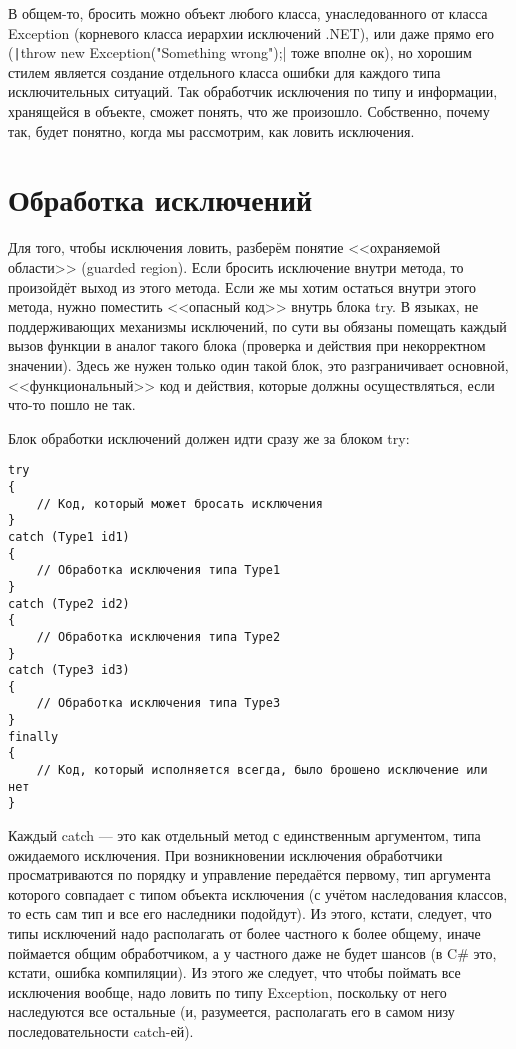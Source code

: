 \documentclass{../../text-style}
\begin{document}
В общем-то, бросить можно объект любого класса, унаследованного от класса Exception (корневого класса иерархии исключений .NET), или даже прямо его (\texttt|throw new Exception("Something wrong");| тоже вполне ок), но хорошим стилем является создание отдельного класса ошибки для каждого типа исключительных ситуаций. Так обработчик исключения по типу и информации, хранящейся в объекте, сможет понять, что же произошло. Собственно, почему так, будет понятно, когда мы рассмотрим, как ловить исключения. 

\section{Обработка исключений}

Для того, чтобы исключения ловить, разберём понятие <<охраняемой области>> (guarded region). Если бросить исключение внутри метода, то произойдёт выход из этого метода. Если же мы хотим остаться внутри этого метода, нужно поместить <<опасный код>> внутрь блока try. В языках, не поддерживающих механизмы исключений, по сути вы обязаны помещать каждый вызов функции в аналог такого блока (проверка и действия при некорректном значении). Здесь же нужен только один такой блок, это разграничивает основной, <<функциональный>> код и действия, которые должны осуществляться, если что-то пошло не так.

Блок обработки исключений должен идти сразу же за блоком try:

\begin{verbatim}
try
{
    // Код, который может бросать исключения
}
catch (Type1 id1)
{
    // Обработка исключения типа Type1
}
catch (Type2 id2)
{
    // Обработка исключения типа Type2
}
catch (Type3 id3)
{
    // Обработка исключения типа Type3
}
finally
{
    // Код, который исполняется всегда, было брошено исключение или нет
}
\end{verbatim}

Каждый catch --- это как отдельный метод с единственным аргументом, типа ожидаемого исключения. При возникновении исключения обработчики просматриваются по порядку и управление передаётся первому, тип аргумента которого совпадает с типом объекта исключения (с учётом наследования классов, то есть сам тип и все его наследники подойдут). Из этого, кстати, следует, что типы исключений надо располагать от более частного к более общему, иначе поймается общим обработчиком, а у частного даже не будет шансов (в C\# это, кстати, ошибка компиляции). Из этого же следует, что чтобы поймать все исключения вообще, надо ловить по типу Exception, поскольку от него наследуются все остальные (и, разумеется, располагать его в самом низу последовательности catch-ей).
\end{document}
